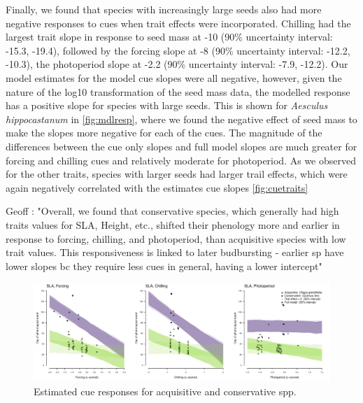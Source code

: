 \documentclass{article}\usepackage[]{graphicx}\usepackage[]{color}
\begin{document}
Finally, we found that species with increasingly large seeds also had more negative responses to cues when trait effects were incorporated. Chilling had the largest trait slope in response to seed mass at -10 (90\% uncertainty interval: -15.3, -19.4), followed by the forcing slope at -8 (90\% uncertainty interval: -12.2, -10.3), the photoperiod slope at -2.2 (90\% uncertainty interval: -7.9, -12.2). Our model estimates for the model cue slopes were all negative, however, given the nature of the log10 transformation of the seed mass data, the modelled response has a positive slope for species with large seeds. This is shown for \textit{Aesculus hippocastanum} in \ref{fig:mdlresp}, where we found the negative effect of seed mass to make the slopes more negative for each of the cues. The magnitude of the differences between the cue only slopes and full model slopes are much greater for forcing and chilling cues and relatively moderate for photoperiod. As we observed for the other traits, species with larger seeds had larger trail effects, which were again negatively correlated with the estimates cue slopes \ref{fig:cuetraits}

Geoff : "Overall, we found that conservative species, which generally had high traits values for SLA, Height, etc., shifted their phenology more and earlier in response to forcing, chilling, and photoperiod, than acquisitive species with low trait values. This responsiveness is linked to later budbursting - earlier sp have lower slopes bc they require less cues in general, having a lower intercept"


\begin{figure}[h!]
    \centering
 \includegraphics[width=\textwidth]{..//..//analyses/traits/figures/results_sla_37spp_ac.pdf} 
    \caption{Estimated cue responses for acquisitive and conservative spp.}
    \label{fig:sla}
\end{figure}
\end{document}
